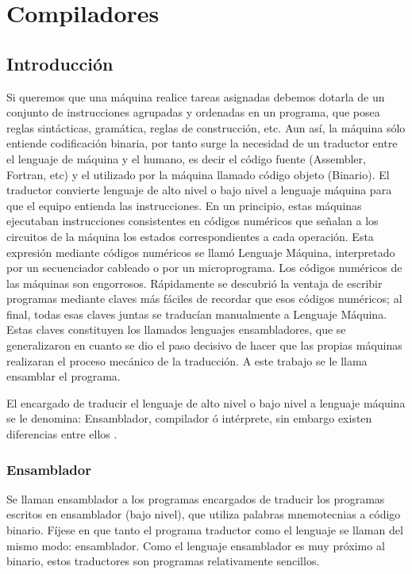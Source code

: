 
\chapter{Compiladores}

\section{Introducción}

Si queremos que una máquina realice tareas asignadas debemos dotarla de un conjunto de instrucciones agrupadas y ordenadas en un programa, que posea reglas sintácticas, gramática, reglas de construcción, etc. Aun así, la máquina sólo entiende codificación binaria, por tanto surge la necesidad de un traductor entre el lenguaje de máquina y el humano, es decir el código fuente (Assembler, Fortran, etc) y el utilizado por la máquina llamado código objeto (Binario). El traductor convierte lenguaje de alto nivel o bajo nivel a lenguaje máquina para que el equipo entienda las instrucciones.
En un principio, estas máquinas ejecutaban instrucciones consistentes en códigos numéricos que señalan a los circuitos de la máquina los estados correspondientes a cada operación. Esta expresión mediante códigos numéricos se llamó Lenguaje Máquina, interpretado por un secuenciador cableado o por un microprograma. Los códigos numéricos de las máquinas son engorrosos. Rápidamente se descubrió la ventaja de escribir programas mediante claves más fáciles de recordar que esos códigos numéricos; al final, todas esas claves juntas se traducían manualmente a Lenguaje Máquina. Estas claves constituyen los llamados lenguajes ensambladores, que se generalizaron en cuanto se dio el paso decisivo de hacer que las propias máquinas realizaran el proceso mecánico de la traducción. A este trabajo se le llama ensamblar el programa.

El encargado de traducir el lenguaje de alto nivel o bajo nivel a lenguaje máquina se le denomina: Ensamblador, compilador ó intérprete, sin embargo existen diferencias entre ellos \cite{CompJFMM}.

\subsection{Ensamblador}
                                                      
Se llaman ensamblador a los programas encargados de traducir los programas escritos en ensamblador (bajo nivel), que utiliza palabras mnemotecnias a código binario. 
Fíjese en que tanto el programa traductor como el lenguaje se llaman del mismo modo: ensamblador.
Como el lenguaje ensamblador es muy próximo al binario, estos traductores son programas relativamente sencillos.

